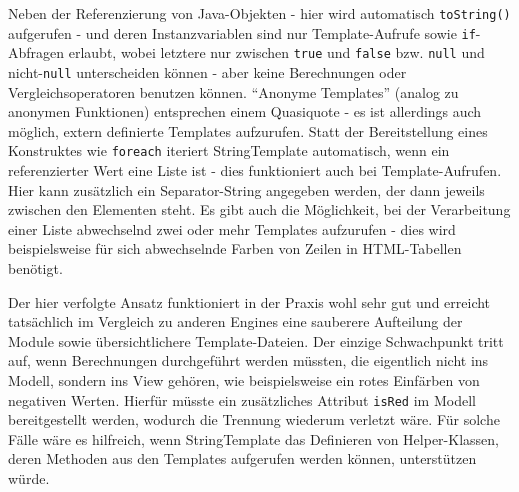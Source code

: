 \documentclass[11pt, a4paper, bibgerm]{scrbook}
\newcommand\icode[1]{\lstinline?#1?}
\begin{document}
Neben der Referenzierung von Java-Objekten - hier wird automatisch
\icode{toString()} aufgerufen - und deren Instanzvariablen sind nur
Template-Aufrufe sowie \icode{if}-Abfragen erlaubt, wobei letztere nur
zwischen \icode{true} und \icode{false} bzw. \icode{null} und
nicht-\icode{null} unterscheiden können - aber keine Berechnungen oder
Vergleichsoperatoren benutzen können. "`Anonyme Templates"' (analog zu
anonymen Funktionen) entsprechen einem Quasiquote - es ist allerdings
auch möglich, extern definierte Templates aufzurufen. Statt der
Bereitstellung eines Konstruktes wie \icode{foreach} iteriert
StringTemplate automatisch, wenn ein referenzierter Wert eine Liste ist
- dies funktioniert auch bei Template-Aufrufen. Hier kann zusätzlich ein
Separator-String angegeben werden, der dann jeweils zwischen den
Elementen steht. Es gibt auch die Möglichkeit, bei der Verarbeitung
einer Liste abwechselnd zwei oder mehr Templates aufzurufen - dies wird
beispielsweise für sich abwechselnde Farben von Zeilen in HTML-Tabellen
benötigt.

Der hier verfolgte Ansatz funktioniert in der Praxis wohl sehr gut und
erreicht tatsächlich im Vergleich zu anderen Engines eine sauberere
Aufteilung der Module sowie übersichtlichere Template-Dateien. Der
einzige Schwachpunkt tritt auf, wenn Berechnungen durchgeführt werden
müssten, die eigentlich nicht ins Modell, sondern ins View gehören, wie
beispielsweise ein rotes Einfärben von negativen Werten. Hierfür müsste
ein zusätzliches Attribut \icode{isRed} im Modell bereitgestellt werden,
wodurch die Trennung wiederum verletzt wäre. Für solche Fälle wäre es
hilfreich, wenn StringTemplate das Definieren von Helper-Klassen, deren
Methoden aus den Templates aufgerufen werden können, unterstützen würde.
\end{document}
